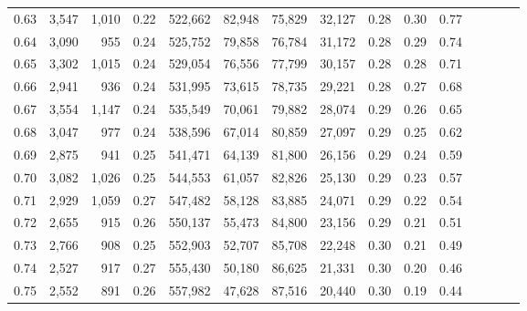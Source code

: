 \begin{tabular}{rrrcrrrrrrrrrrr}
0.63 &   3,547 &  1,010 &                                       0.22 &  522,662 &   82,948 &   75,829 &   32,127 &  0.28 &  0.30 &                         0.77 \\
0.64 &   3,090 &    955 &                                       0.24 &  525,752 &   79,858 &   76,784 &   31,172 &  0.28 &  0.29 &                         0.74 \\
0.65 &   3,302 &  1,015 &                                       0.24 &  529,054 &   76,556 &   77,799 &   30,157 &  0.28 &  0.28 &                         0.71 \\
0.66 &   2,941 &    936 &                                       0.24 &  531,995 &   73,615 &   78,735 &   29,221 &  0.28 &  0.27 &                         0.68 \\
0.67 &   3,554 &  1,147 &                                       0.24 &  535,549 &   70,061 &   79,882 &   28,074 &  0.29 &  0.26 &                         0.65 \\
0.68 &   3,047 &    977 &                                       0.24 &  538,596 &   67,014 &   80,859 &   27,097 &  0.29 &  0.25 &                         0.62 \\
0.69 &   2,875 &    941 &                                       0.25 &  541,471 &   64,139 &   81,800 &   26,156 &  0.29 &  0.24 &                         0.59 \\
0.70 &   3,082 &  1,026 &                                       0.25 &  544,553 &   61,057 &   82,826 &   25,130 &  0.29 &  0.23 &                         0.57 \\
0.71 &   2,929 &  1,059 &                                       0.27 &  547,482 &   58,128 &   83,885 &   24,071 &  0.29 &  0.22 &                         0.54 \\
0.72 &   2,655 &    915 &                                       0.26 &  550,137 &   55,473 &   84,800 &   23,156 &  0.29 &  0.21 &                         0.51 \\
0.73 &   2,766 &    908 &                                       0.25 &  552,903 &   52,707 &   85,708 &   22,248 &  0.30 &  0.21 &                         0.49 \\
0.74 &   2,527 &    917 &                                       0.27 &  555,430 &   50,180 &   86,625 &   21,331 &  0.30 &  0.20 &                         0.46 \\
0.75 &   2,552 &    891 &                                       0.26 &  557,982 &   47,628 &   87,516 &   20,440 &  0.30 &  0.19 &                         0.44 \\

\end{tabular}
